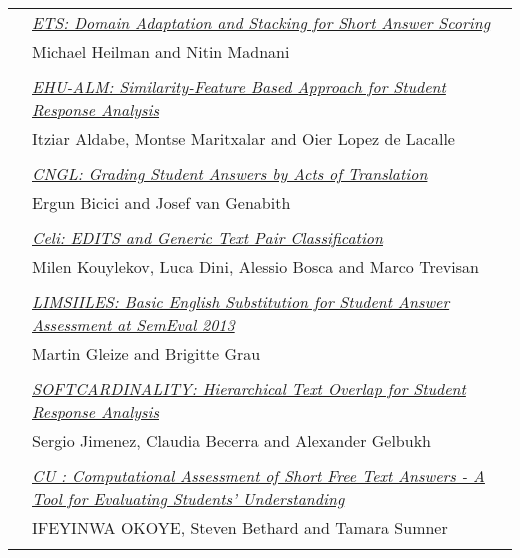 \begin{tabular}{p{20mm}p{138mm}}
& \hyperlink{page.275}{\em ETS: Domain Adaptation and Stacking for Short Answer Scoring}\\
         & Michael Heilman and Nitin Madnani \\
\\


 & \hyperlink{page.580}{\em EHU-ALM: Similarity-Feature Based Approach for Student Response Analysis}\\
         & Itziar Aldabe, Montse Maritxalar and Oier Lopez de Lacalle \\
\\

 & \hyperlink{page.585}{\em CNGL: Grading Student Answers by Acts of Translation}\\
         & Ergun Bicici and Josef van Genabith \\
\\

 & \hyperlink{page.592}{\em Celi: EDITS and Generic Text Pair Classification}\\
         & Milen Kouylekov, Luca Dini, Alessio Bosca and Marco Trevisan \\
\\

 & \hyperlink{page.598}{\em LIMSIILES: Basic English Substitution for Student Answer Assessment at SemEval 2013}\\
         & Martin Gleize and Brigitte Grau \\
\\

& \hyperlink{page.280}{\em SOFTCARDINALITY: Hierarchical Text Overlap for Student Response Analysis}\\
         & Sergio Jimenez, Claudia Becerra and Alexander Gelbukh \\
\\


 & \hyperlink{page.603}{\em CU : Computational Assessment of Short Free Text Answers - A Tool for Evaluating Students' Understanding}\\
         & IFEYINWA OKOYE, Steven Bethard and Tamara Sumner \\
\\


\end{tabular}
\newpage
